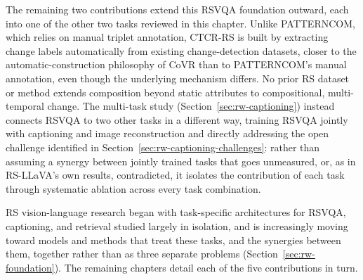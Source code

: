 The remaining two contributions extend this RSVQA foundation outward, each into one of the other two tasks reviewed in this chapter. Unlike PATTERNCOM, which relies on manual triplet annotation, CTCR-RS is built by extracting change labels automatically from existing change-detection datasets, closer to the automatic-construction philosophy of CoVR than to PATTERNCOM's manual annotation, even though the underlying mechanism differs. No prior RS dataset or method extends composition beyond static attributes to compositional, multi-temporal change. The multi-task study (Section~\ref{sec:rw-captioning}) instead connects RSVQA to two other tasks in a different way, training RSVQA jointly with captioning and image reconstruction and directly addressing the open challenge identified in Section~\ref{sec:rw-captioning-challenges}: rather than assuming a synergy between jointly trained tasks that goes unmeasured, or, as in RS-LLaVA's own results, contradicted, it isolates the contribution of each task through systematic ablation across every task combination.
 
RS vision-language research began with  task-specific architectures for RSVQA, captioning, and retrieval studied largely in isolation, and is increasingly moving toward models and methods that treat these tasks, and the synergies between them, together rather than as three separate problems (Section~\ref{sec:rw-foundation}). The remaining chapters detail each of the five contributions in turn.